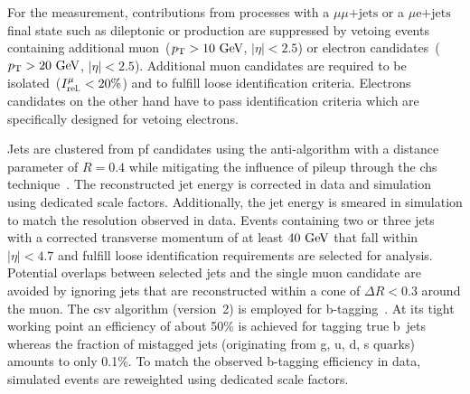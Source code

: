 
For the measurement, contributions from processes with a $\mu\mu\mathrm{\mbox{+}jets}$ or a $\mu\mathrm{e}\mathrm{\mbox{+}jets}$ final state such as dileptonic \ttbar or \zjets production are suppressed by vetoing events containing additional muon~($p_\textrm{T}>10~\textrm{GeV}$, $|\eta|<2.5$) or electron candidates~($p_\textrm{T}>20~\textrm{GeV}$, $|\eta|<2.5$). Additional muon candidates are required to be isolated~($\muiso<20\%$) and to fulfill loose identification criteria. Electrons candidates on the other hand have to pass identification criteria which are specifically designed for vetoing electrons.

Jets are clustered from \Gls{pf} candidates using the anti-\kt algorithm with a distance parameter of $R=0.4$ while mitigating the influence of pileup through the \gls{chs} technique~\cite{CMS-PAS-JME-14-001}. The reconstructed jet energy is corrected in data and simulation using dedicated scale factors. Additionally, the jet energy is smeared in simulation to match the resolution observed in data. Events containing two or three jets with a corrected transverse momentum of at least $40~\textrm{GeV}$ that fall within $|\eta|<4.7$ and fulfill loose identification requirements are selected for analysis. Potential overlaps between selected jets and the single muon candidate are avoided by ignoring jets that are reconstructed within a cone of $\Delta R<0.3$ around the muon. The \acrfull{csv} algorithm (version~2) is employed for b-tagging~\cite{CMS-PAS-BTV-15-001}. At its tight working point an efficiency of about 50\% is achieved for tagging true b~jets whereas the fraction of mistagged jets (originating from g, u, d, s quarks) amounts to only 0.1\%. To match the observed b-tagging efficiency in data, simulated events are reweighted using dedicated scale factors.

